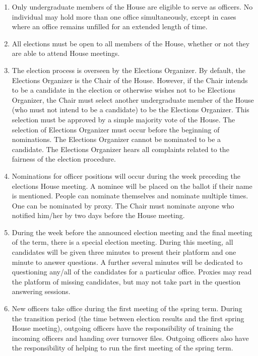 \documentclass[letterpaper]{article}
\begin{document}
\begin{enumerate}
\begin{enumerate}
\begin{enumerate}
\item Only undergraduate members of the House are eligible to serve as officers. No individual may hold more than one office simultaneously, except in cases where an office remains unfilled for an extended length of time.

\item All elections must be open to all members of the House, whether or not they are able to attend House meetings.

\item The election process is overseen by the Elections Organizer. By default, the Elections Organizer is the Chair of the House. However, if the Chair intends to be a candidate in the election or otherwise wishes not to be Elections Organizer, the Chair must select another undergraduate member of the House (who must not intend to be a candidate) to be the Elections Organizer. This selection must be approved by a simple majority vote of the House. The selection of Elections Organizer must occur before the beginning of nominations. The Elections Organizer cannot be nominated to be a candidate. The Elections Organizer hears all complaints related to the fairness of the election procedure.

\item Nominations for officer positions will occur during the week preceding the elections House meeting. A nominee will be placed on the ballot if their name is mentioned. People can nominate themselves and nominate multiple times. One can be nominated by proxy. The Chair must nominate anyone who notified him/her by two days before the House meeting.

\item During the week before the announced election meeting and the final meeting of the term, there is a special election meeting. During this meeting, all candidates will be given three minutes to present their platform and one minute to answer questions. A further several minutes will be dedicated to questioning any/all of the candidates for a particular office. Proxies may read the platform of missing candidates, but may not take part in the question answering sessions.

\item New officers take office during the first meeting of the spring term. During the transition period (the time between election results and the first spring House meeting), outgoing officers have the responsibility of training the incoming officers and handing over turnover files. Outgoing officers also have the responsibility of
helping to run the first meeting of the spring term.


\end{enumerate}
\end{enumerate}
\end{enumerate}
\end{document}
